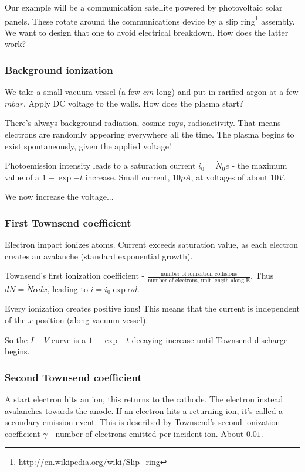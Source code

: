 \documentclass[PlasmaNotes.tex]{subfiles}
\begin{document}
Our example will be a communication satellite powered by photovoltaic solar panels. These rotate around the communications device by a slip ring\footnote{\url{http://en.wikipedia.org/wiki/Slip_ring}} assembly. We want to design that one to avoid electrical breakdown. How does the latter work?

\subsubsection{Background ionization}

We take a small vacuum vessel (a few $cm$ long) and put in rarified argon at a few $mbar$. Apply DC voltage to the walls. How does the plasma start?

There's always background radiation, cosmic rays, radioactivity. That means electrons are randomly appearing everywhere all the time. The plasma begins to exist spontaneously, given the applied voltage!

Photoemission intensity leads to a saturation current $i_0 = \dot{N}_0 e$ - the maximum value of a $1-\exp{-t}$ increase. Small current, $10 pA$, at voltages of about $10 V$.

We now increase the voltage...

\subsubsection{First Townsend coefficient}

Electron impact ionizes atoms. Current exceeds saturation value, as each electron creates an avalanche (standard exponential growth).

Townsend's first ionization coefficient - $\frac{\text{number of ionization collisions}}{\text{number of electrons, unit length along E}}$. Thus $d\dot{N} = \dot{N} \alpha dx$, leading to $i=i_0 \exp{\alpha d}$.

Every ionization creates positive ions! This means that the current is independent of the $x$ position (along vacuum vessel).

So the $I-V$ curve is a $1-\exp{-t}$ decaying increase until Townsend discharge begins.

\subsubsection{Second Townsend coefficient}

A start electron hits an ion, this returns to the cathode. The electron instead avalanches towards the anode. If an electron hits a returning ion, it's called a secondary emission event. This is described by Townsend's second ionization coefficient $\gamma$ - number of electrons emitted per incident ion. About $0.01$. 
\end{document}
